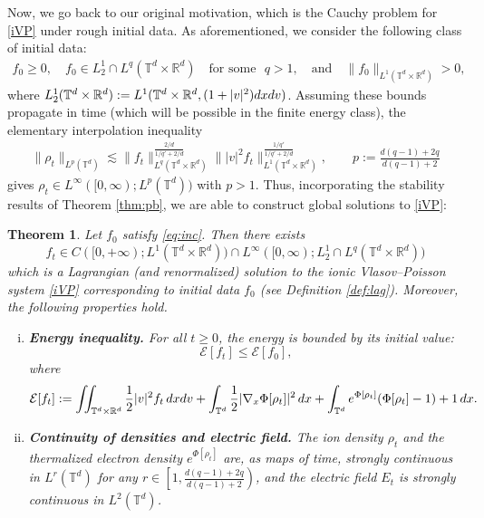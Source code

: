 \documentclass[11pt,reqno,a4paper]{amsart}
\newcommand{\R}{\mathbb{R}}
\newcommand{\intt}{\int_{\T^d}}
\newtheorem{theorem}{Theorem}[section]
\theoremstyle{definition}
\theoremstyle{remark}
\numberwithin{equation}{section}
\newcommand{\T} {\mathbb T}
\newcommand{\bq}{\begin{equation}}
\newcommand{\eq}{\end{equation}}
\newcommand{\calE}{\mathcal E}
\newcommand{\dx}{\textnormal{d}x}
\newcommand{\dv}{\textnormal{d}v}
\begin{document}
 
%
%
%
%
%


Now, we go back to our original motivation, which is the Cauchy problem for \eqref{iVP} under rough initial data. As aforementioned, we consider the following class of initial data:
\begin{align}
    \label{eq:inc}
    f_0 \ge 0, \quad f_0 \in L^1_2 \cap L^q(\T^d \times \R^d)\quad \text{for some }\,\,q>1, \quad \text{and} \quad \|f_0\|_{L^1(\T^d\times\R^d)} > 0,
    \end{align}
    where $L^1_2(\T^d\times\R^d):= L^1(\T^d\times\R^d,(1+|v|^2)\dx\dv)$. Assuming these bounds propagate in time (which will be possible in the finite energy class), the elementary interpolation inequality
\begin{align}
\label{eq: elem interpolation}
    \|\rho_t\|_{L^p(\T^d)} \lesssim \|f_t\|_{L^{q}(\T^d\times\R^d)}^{\frac{2/d}{1/q' + 2/d}} \||v|^2 f_t\|_{L^1(\T^d\times\R^d)}^{\frac{1/q'}{1/q' + 2/d}}, \qquad p := \frac{d(q-1)+2q}{d(q-1)+2}
\end{align}
gives $\rho_t \in L^\infty([0,\infty);L^p(\T^d))$ with $p>1$. Thus, incorporating the stability results of Theorem \ref{thm:pb}, we are able to construct global solutions to \eqref{iVP}:
    

\begin{theorem}\label{thm:lag}
Let $f_0$ satisfy \eqref{eq:inc}. Then there exists
\[%
f_t \in C([0,+\infty);L^1(\T^d\times\R^d)) \cap L^\infty([0,\infty);L_2^1\cap L^q(\T^d\times\R^d))
\]
which is a Lagrangian (and renormalized) solution
to the ionic Vlasov--Poisson system \eqref{iVP} corresponding to initial data $f_0$ (see Definition \ref{def:lag}). Moreover, the following properties hold.
\begin{enumerate}[(i)]
\item \textbf{Energy inequality.}  For all $t \ge0$, the energy is bounded by its initial value:
\bq\label{eq:egyi}
\calE[f_t] \le \calE[f_0],
\eq
where
\bq\label{eq:egy}
\calE[f_t]:=\iint_{\T^d\times\R^d} \frac{1}{2}|v|^2 f_t \,\dx\dv + \intt \frac{1}{2}|\nabla_x\Phi[\rho_t]|^2\,\dx + \intt e^{\Phi[\rho_t]}(\Phi[\rho_t]-1)+1 \,\dx.
\eq
\item \textbf{Continuity of densities and electric field.} The ion density $\rho_t$ and the thermalized electron density $e^{\Phi[\rho_t]}$ are, as maps of time, strongly continuous in $L^r(\T^d)$ for any $r\in \left[1,\frac{d(q-1)+2q}{d(q-1)+2}\right)$, and the electric field $E_t$ is strongly continuous in $L^2(\T^d)$.
\end{enumerate}
\end{theorem}
\end{document}
